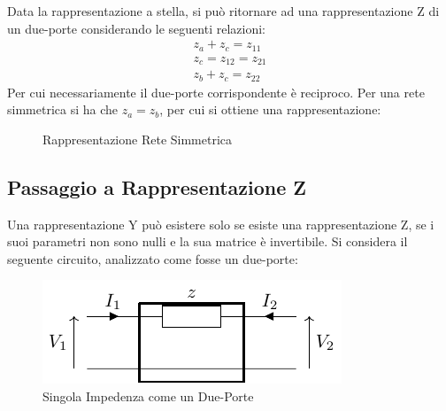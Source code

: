 \documentclass{article}
\numberwithin{equation}{subsection}
\begin{document}
Data la rappresentazione a stella, si può ritornare ad una rappresentazione Z di un due-porte considerando le seguenti relazioni:
\begin{gather*}
    z_a+z_c=z_{11}\\
    z_c=z_{12}=z_{21}\\
    z_b+z_c=z_{22}
\end{gather*}
Per cui necessariamente il due-porte corrispondente è reciproco. Per una rete simmetrica si ha che $z_a=z_b$, per cui si ottiene una rappresentazione:
\begin{figure}[ht]%
    \centering
    \qquad
    \caption{Rappresentazione Rete Simmetrica}
    \label{fig:rappresentazione-rete-simmetrica}
\end{figure}

\subsection{Passaggio a Rappresentazione Z}

Una rappresentazione Y può esistere solo se esiste una rappresentazione Z, se i suoi parametri non sono nulli e la sua matrice è invertibile. 
Si considera il seguente circuito, analizzato come fosse un due-porte:
\begin{figure}[ht]%
    \centering
    \includegraphics{singola-impedenza-due-porte.pdf}
    \caption{Singola Impedenza come un Due-Porte}
    \label{fig:singola-impedenza-due-porte}
\end{figure}
\end{document}

